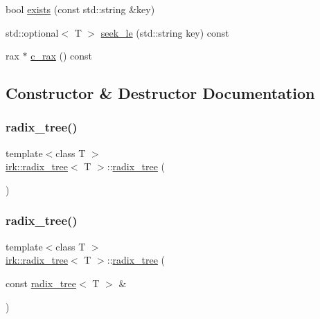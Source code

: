 \begin{DoxyCompactItemize}
\item 
bool \mbox{\hyperlink{classirk_1_1radix__tree_a3b9cecf1586c0e96b3ea55224db7c389}{exists}} (const std\+::string \&key)
\item 
std\+::optional$<$ T $>$ \mbox{\hyperlink{classirk_1_1radix__tree_aec3e27fbf3cd3f0e2d75183d392b0946}{seek\+\_\+le}} (std\+::string key) const
\item 
rax $\ast$ \mbox{\hyperlink{classirk_1_1radix__tree_aed4255775e1f9f2a4647e80a408c9946}{c\+\_\+rax}} () const
\end{DoxyCompactItemize}


\subsection{Constructor \& Destructor Documentation}
\mbox{\label{classirk_1_1radix__tree_a276f716ad240e75b4a3b2d1ee7c06663}} 
\subsubsection{\texorpdfstring{radix\+\_\+tree()}{radix\_tree()}\hspace{0.1cm}{\footnotesize\ttfamily [1/3]}}
{\footnotesize\ttfamily template$<$class T $>$ \\
\mbox{\hyperlink{classirk_1_1radix__tree}{irk\+::radix\+\_\+tree}}$<$ T $>$\+::\mbox{\hyperlink{classirk_1_1radix__tree}{radix\+\_\+tree}} (\begin{DoxyParamCaption}{ }\end{DoxyParamCaption})\hspace{0.3cm}{\ttfamily [inline]}}

\mbox{\label{classirk_1_1radix__tree_aaffbfdc0d841373868a7ca6672d0999f}} 
\subsubsection{\texorpdfstring{radix\+\_\+tree()}{radix\_tree()}\hspace{0.1cm}{\footnotesize\ttfamily [2/3]}}
{\footnotesize\ttfamily template$<$class T $>$ \\
\mbox{\hyperlink{classirk_1_1radix__tree}{irk\+::radix\+\_\+tree}}$<$ T $>$\+::\mbox{\hyperlink{classirk_1_1radix__tree}{radix\+\_\+tree}} (\begin{DoxyParamCaption}\item[{const \mbox{\hyperlink{classirk_1_1radix__tree}{radix\+\_\+tree}}$<$ T $>$ \&}]{ }\end{DoxyParamCaption})\hspace{0.3cm}{\ttfamily [delete]}}

